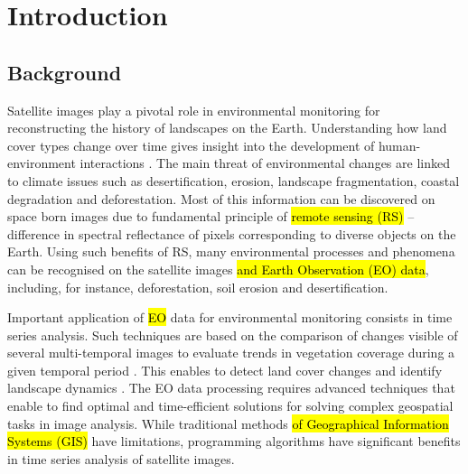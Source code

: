 \documentclass[jimaging,article,submit,pdftex,moreauthors]{Definitions/mdpi}
\begin{document}
\section{Introduction}

\subsection{Background}

{Satellite images play a pivotal role in environmental monitoring for reconstructing the} history of landscapes{ }{ }on the Earth. Understanding how land cover types change over time gives{ }insight into {the development of }human-environment interactions \cite{Ndehedehe2022,Foli,Speranza}. The main threat of environmental {changes are} linked to climate issues such as desertification, erosion, landscape fragmentation, coastal degradation {and} deforestation. Most of this information {can be discovered on space born images due to fundamental principle of \hl{remote sensing (RS)} -- difference in spectral reflectance of pixels corresponding to diverse objects on the Earth. Using such benefits of RS, many} environmental processes and phenomena can be recognised on the satellite images \hl{and Earth Observation (EO) data}, including, for instance, deforestation, soil erosion and desertification. 

Important application of \hl{EO} data for environmental monitoring consists in time series analysis. Such techniques are based on the comparison of changes visible of several multi-temporal images to evaluate trends in vegetation coverage during a given temporal period \cite{Springer2023,10281679}. {This enables to detect land cover changes and} identify {landscape} dynamics \cite{su13084092,NATARAJAN2016256}. The EO data processing requires advanced techniques that enable to find optimal and time-efficient solutions for solving complex geospatial tasks in image analysis. While traditional methods \hl{of Geographical Information Systems (GIS) }have limitations, programming algorithms have significant benefits in time series analysis of satellite images.
\end{document}
